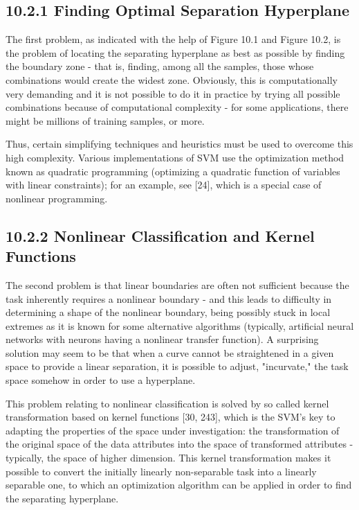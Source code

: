 \documentclass[10pt]{book}
\begin{document}
\subsection*{10.2.1 Finding Optimal Separation Hyperplane}
The first problem, as indicated with the help of Figure 10.1 and Figure 10.2, is the problem of locating the separating hyperplane as best as possible by finding the boundary zone - that is, finding, among all the samples, those whose combinations would create the widest zone. Obviously, this is computationally very demanding and it is not possible to do it in practice by trying all possible combinations because of computational complexity - for some applications, there might be millions of training samples, or more.

Thus, certain simplifying techniques and heuristics must be used to overcome this high complexity. Various implementations of SVM use the optimization method known as quadratic programming (optimizing a quadratic function of variables with linear constraints); for an example, see [24], which is a special case of nonlinear programming.

\subsection*{10.2.2 Nonlinear Classification and Kernel Functions}
The second problem is that linear boundaries are often not sufficient because the task inherently requires a nonlinear boundary - and this leads to difficulty in determining a shape of the nonlinear boundary, being possibly stuck in local extremes as it is known for some alternative algorithms (typically, artificial neural networks with neurons having a nonlinear transfer function). A surprising solution may seem to be that when a curve cannot be straightened in a given space to provide a linear separation, it is possible to adjust, "incurvate," the task space somehow in order to use a hyperplane.

This problem relating to nonlinear classification is solved by so called kernel transformation based on kernel functions [30, 243], which is the SVM's key to adapting the properties of the space under investigation: the transformation of the original space of the data attributes into the space of transformed attributes - typically, the space of higher dimension. This kernel transformation makes it possible to convert the initially linearly non-separable task into a linearly separable one, to which an optimization algorithm can be applied in order to find the separating hyperplane.
\end{document}
